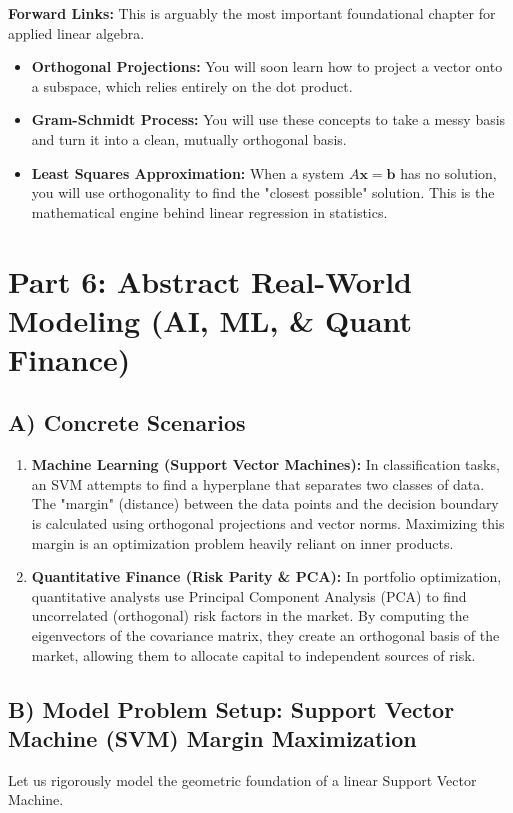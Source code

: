 \documentclass[11pt, letterpaper]{article}
\theoremstyle{definition}
\theoremstyle{remark}
\begin{document}
\textbf{Forward Links:} This is arguably the most important foundational chapter for applied linear algebra. 
\begin{itemize}
    \item \textbf{Orthogonal Projections:} You will soon learn how to project a vector onto a subspace, which relies entirely on the dot product.
    \item \textbf{Gram-Schmidt Process:} You will use these concepts to take a messy basis and turn it into a clean, mutually orthogonal basis.
    \item \textbf{Least Squares Approximation:} When a system $A\mathbf{x} = \mathbf{b}$ has no solution, you will use orthogonality to find the "closest possible" solution. This is the mathematical engine behind linear regression in statistics.
\end{itemize}

\newpage
\section{Part 6: Abstract Real-World Modeling (AI, ML, \& Quant Finance)}

\subsection{A) Concrete Scenarios}
\begin{enumerate}
    \item \textbf{Machine Learning (Support Vector Machines):} In classification tasks, an SVM attempts to find a hyperplane that separates two classes of data. The "margin" (distance) between the data points and the decision boundary is calculated using orthogonal projections and vector norms. Maximizing this margin is an optimization problem heavily reliant on inner products.
    \item \textbf{Quantitative Finance (Risk Parity \& PCA):} In portfolio optimization, quantitative analysts use Principal Component Analysis (PCA) to find uncorrelated (orthogonal) risk factors in the market. By computing the eigenvectors of the covariance matrix, they create an orthogonal basis of the market, allowing them to allocate capital to independent sources of risk.
\end{enumerate}

\subsection{B) Model Problem Setup: Support Vector Machine (SVM) Margin Maximization}
Let us rigorously model the geometric foundation of a linear Support Vector Machine. 
\end{document}
